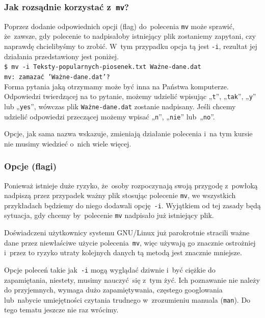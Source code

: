 \documentclass[10pt,t]{beamer}
\begin{document}
\begin{frame}
  \frametitle{Jak rozsądnie korzystać z~\texttt{mv}?}


  Poprzez dodanie odpowiednich opcji (flag) do~polecenia \texttt{mv}
  może sprawić, że~zawsze, gdy polecenie to nadpisałoby istniejący
  plik zostaniemy zapytani, czy naprawdę chcielibyśmy to zrobić.
  W~tym przypadku opcja tą jest \texttt{-i}, rezultat jej działania
  przedstawiony jest poniżej. \\
  \texttt{\$ mv -i Teksty-popularnych-piosenek.txt Ważne-dane.dat} \\
  \texttt{mv: zamazać 'Ważne-dane.dat'?} \\
  Forma pytania jaką otrzymamy może być inna na Państwa komputerze.
  Odpowiedzi twierdzącej na to pytanie, możemy udzielić wpisując
  „\texttt{t}”, „\texttt{tak}”, „\texttt{y}” lub „\texttt{yes}”, wówczas
  plik \texttt{Ważne-dane.dat} zostanie nadpisany. Jeśli chcemy udzielić
  odpowiedzi przeczącej możemy wpisać „\texttt{n}”, „\texttt{nie}”
  lub~„\texttt{no}”.

  Opcje, jak sama nazwa wskazuje, zmieniają działanie polecenia i~na tym
  kursie nie musimy wiedzieć o~nich wiele więcej.

\end{frame}





\begin{frame}
  \frametitle{Opcje (flagi)}


  Ponieważ istnieje duże ryzyko, że~osoby rozpoczynają swoją przygodę
  z~powłoką nadpiszą przez przypadek ważny plik stosując polecenie
  \texttt{mv}, we wszystkich przykładach będziemy do niego dodawali
  opcję~\texttt{-i}. Wyjątkiem od tej zasady będą sytuacja, gdy chcemy
  by~polecenie \texttt{mv} nadpisało już istniejący plik.

  Doświadczeni użytkownicy systemu GNU/Linux już parokrotnie stracili ważne
  dane przez niewłaściwe użycie polecenia~\texttt{mv}, więc używają go
  znacznie ostrożniej i~przez to ryzyko utraty kolejnych danych tą metodą
  jest znacznie mniejsze.

  Opcje poleceń takie jak~\texttt{-i} mogą wyglądać dziwnie i~być ciężkie
  do zapamiętania, niestety, musimy nauczyć~się z~tym żyć. Ich poznawanie
  nie należy do przyjemnych, wymaga dużo zapamiętywania, częstego
  googlowania lub~nabycie umiejętności czytania trudnego w~zrozumieniu
  manuala (\texttt{man}). Do tego tematu jeszcze nie raz wrócimy.

\end{frame}
\end{document}
